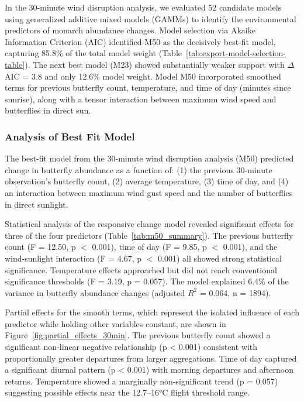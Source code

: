 In the 30-minute wind disruption analysis, we evaluated 52 candidate models using generalized additive mixed models (GAMMs) to identify the environmental predictors of monarch abundance changes. Model selection via Akaike Information Criterion (AIC) identified M50 as the decisively best-fit model, capturing 85.8\% of the total model weight (Table~\ref{tab:export-model-selection-table}). The next best model (M23) showed substantially weaker support with $\Delta$AIC = 3.8 and only 12.6\% model weight. Model M50 incorporated smoothed terms for previous butterfly count, temperature, and time of day (minutes since sunrise), along with a tensor interaction between maximum wind speed and butterflies in direct sun.

 

\subsubsection{Analysis of Best Fit Model}

The best-fit model from the 30-minute wind disruption analysis (M50) predicted change in butterfly abundance as a function of: (1) the previous 30-minute observation's butterfly count, (2) average temperature, (3) time of day, and (4) an interaction between maximum wind gust speed and the number of butterflies in direct sunlight.

Statistical analysis of the responsive change model revealed significant effects for three of the four predictors (Table~\ref{tab:m50_summary}). The previous butterfly count (F = 12.50, p $<$ 0.001), time of day (F = 9.85, p $<$ 0.001), and the wind-sunlight interaction (F = 4.67, p $<$ 0.001) all showed strong statistical significance. Temperature effects approached but did not reach conventional significance thresholds (F = 3.19, p = 0.057). The model explained 6.4\% of the variance in butterfly abundance changes (adjusted $R^2$ = 0.064, n = 1894).



Partial effects for the smooth terms, which represent the isolated influence of each predictor while holding other variables constant, are shown in Figure~\ref{fig:partial_effects_30min}. The previous butterfly count showed a significant non-linear negative relationship (p < 0.001) consistent with proportionally greater departures from larger aggregations. Time of day captured a significant diurnal pattern (p < 0.001) with morning departures and afternoon returns. Temperature showed a marginally non-significant trend (p = 0.057) suggesting possible effects near the 12.7–16°C flight threshold range.

